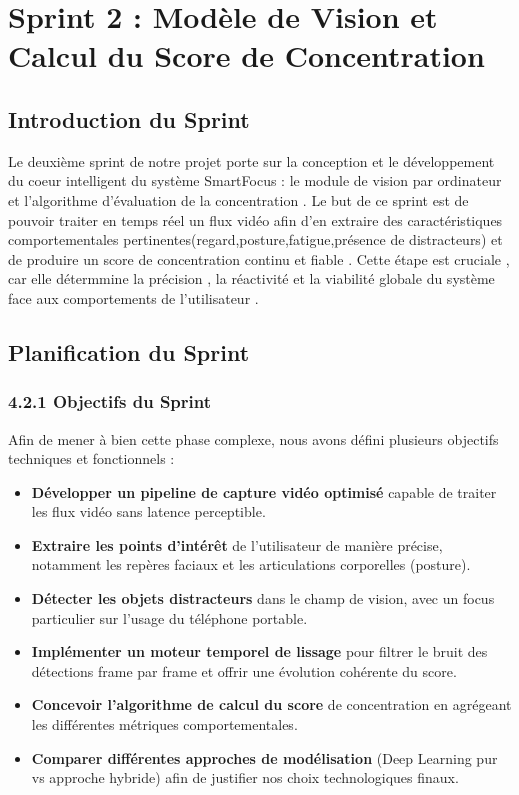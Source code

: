 \chapter{Sprint 2 : Modèle de Vision et Calcul du Score de Concentration}

\section{ Introduction du Sprint}

Le deuxième sprint de notre projet porte sur la conception et le développement du coeur intelligent du système SmartFocus : le module de vision par ordinateur et l'algorithme d'évaluation de la concentration . Le but de ce sprint est de pouvoir traiter en temps réel un flux vidéo afin d'en extraire des caractéristiques comportementales pertinentes(regard,posture,fatigue,présence de distracteurs) et de produire un score de concentration continu et fiable . Cette étape est cruciale , car elle détermmine la précision , la réactivité et la viabilité globale du système face aux comportements de l'utilisateur .

\section{ Planification du Sprint}

\subsection{4.2.1 Objectifs du Sprint}
Afin de mener à bien cette phase complexe, nous avons défini plusieurs objectifs techniques et fonctionnels :
\begin{itemize}
    \item \textbf{Développer un pipeline de capture vidéo optimisé} capable de traiter les flux vidéo sans latence perceptible.
    \item \textbf{Extraire les points d’intérêt} de l'utilisateur de manière précise, notamment les repères faciaux et les articulations corporelles (posture).
    \item \textbf{Détecter les objets distracteurs} dans le champ de vision, avec un focus particulier sur l'usage du téléphone portable.
    \item \textbf{Implémenter un moteur temporel de lissage} pour filtrer le bruit des détections frame par frame et offrir une évolution cohérente du score.
    \item \textbf{Concevoir l'algorithme de calcul du score} de concentration en agrégeant les différentes métriques comportementales.
    \item \textbf{Comparer différentes approches de modélisation} (Deep Learning pur vs approche hybride) afin de justifier nos choix technologiques finaux.
\end{itemize}

